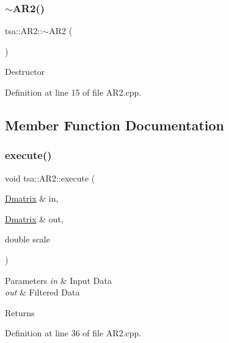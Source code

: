 \subsubsection{\texorpdfstring{$\sim$\+A\+R2()}{~AR2()}}
{\footnotesize\ttfamily tsa\+::\+A\+R2\+::$\sim$\+A\+R2 (\begin{DoxyParamCaption}{ }\end{DoxyParamCaption})\hspace{0.3cm}{\ttfamily [virtual]}}

Destructor 

Definition at line 15 of file A\+R2.\+cpp.



\subsection{Member Function Documentation}
\mbox{\label{classtsa_1_1_a_r2_a5a3bc7f3a15baca56a2660fff78259f9}} 
\subsubsection{\texorpdfstring{execute()}{execute()}}
{\footnotesize\ttfamily void tsa\+::\+A\+R2\+::execute (\begin{DoxyParamCaption}\item[{\hyperlink{namespacetsa_ad260cd21c1891c4ed391fe788569aba4}{Dmatrix} \&}]{in,  }\item[{\hyperlink{namespacetsa_ad260cd21c1891c4ed391fe788569aba4}{Dmatrix} \&}]{out,  }\item[{double}]{scale }\end{DoxyParamCaption})}


\begin{DoxyParams}{Parameters}
{\em in} & Input Data \\
\hline
{\em out} & Filtered Data \\
\hline
\end{DoxyParams}
\begin{DoxyReturn}{Returns}

\end{DoxyReturn}


Definition at line 36 of file A\+R2.\+cpp.

\mbox{\label{classtsa_1_1_a_r2_ac99c0344d5376911a0976a78c0f8a96f}} 

